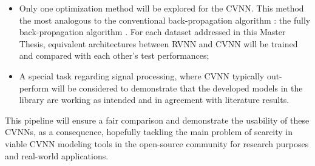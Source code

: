 \begin{itemize}
    \item Only one optimization method will be explored for the \gls{CVNN}. This method the most analogous to the conventional back-propagation algorithm \parencite{rumelhart1986}: the fully back-propagation algorithm \parencite{barrachina2023theory}. For each dataset addressed in this Master Thesis, equivalent architectures between RVNN and CVNN will be trained and compared with each other's test performances;
    \item A special task regarding signal processing, where \gls{CVNN} typically out-perform will be considered to demonstrate that the developed models in the library are working as intended and in agreement with literature results.
\end{itemize}

This pipeline will ensure a fair comparison and demonstrate the usability of these \gls{CVNN}s, as a consequence, hopefully tackling the main problem of scarcity in viable \gls{CVNN} modeling tools in the open-source community for research purposes and real-world applications.
